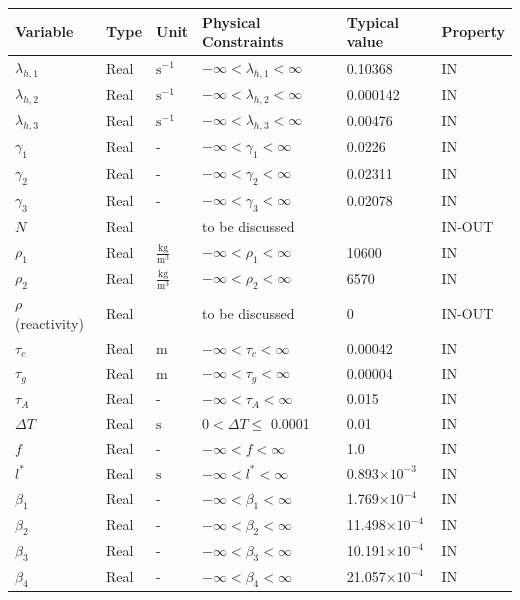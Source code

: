 \noindent
\begin{longtable}{| p{\colCwidth} | p{\colCwidth} | p{\colDwidth}| p{\colAwidth}|
    p{\colFwidth}|p{\colCwidth}|}
\hline
\rowcolor[gray]{0.9}
Variable & Type & Unit & Physical Constraints & Typical value & Property\\
\hline
$\lambda_{h,1}$&Real&$\text{s}^{-1}$&$ -\infty <\lambda_{h,1}<\infty $&0.10368&IN\\
\hline
$\lambda_{h,2}$&Real&$\text{s}^{-1}$&$ -\infty <\lambda_{h,2}<\infty $&0.000142&IN\\
\hline
$\lambda_{h,3}$&Real&$\text{s}^{-1}$&$ -\infty <\lambda_{h,3}<\infty $&0.00476&IN\\
\hline
$\gamma_1$&Real&-&$-\infty <\gamma_1<\infty$&0.0226&IN\\
\hline
$\gamma_2$&Real&-&$-\infty <\gamma_2<\infty$&0.02311&IN\\
\hline
$\gamma_3$&Real&-&$-\infty <\gamma_3<\infty$&0.02078&IN\\
\hline
$N$&Real&&to be discussed&&IN-OUT\\
\hline
$\rho_1$&Real&$\frac{\text{kg}}{\text{m}^3}$&$-\infty< \rho_1<\infty$&10600&IN\\
\hline
$\rho_2$&Real&$\frac{\text{kg}}{\text{m}^3}$&$-\infty< \rho_2<\infty$&6570&IN\\
\hline
$\rho$ (reactivity)&Real&&to be discussed&0&IN-OUT\\
\hline
$\tau_c$&Real&$\text{m}$&$-\infty< \tau_c<\infty$&0.00042&IN\\
\hline
$\tau_g$&Real&$\text{m}$&$-\infty< \tau_g<\infty$&0.00004&IN\\
\hline
$\tau_A$&Real&-&$-\infty< \tau_A<\infty$&0.015&IN\\
\hline
$\Delta T$&Real&$\text{s}$&$0<\Delta T\leq$ 0.0001&0.01&IN\\
\hline
$f$&Real&-&$-\infty< f<\infty$&1.0&IN\\
\hline
$l^*$&Real&$\text{s}$&$-\infty< l^* <\infty$&0.893$\times 10^{-3}$&IN\\
\hline
$\beta_1$&Real&-&$-\infty < \beta_1<\infty$&1.769$\times 10^{-4}$&IN\\
\hline
$\beta_2$&Real&-&$-\infty < \beta_2<\infty$&11.498$\times 10^{-4}$&IN\\
\hline
$\beta_3$&Real&-&$-\infty < \beta_3<\infty$&10.191$\times 10^{-4}$&IN\\
\hline
$\beta_4$&Real&-&$-\infty < \beta_4<\infty$&21.057$\times 10^{-4}$&IN\\

\end{longtable}
